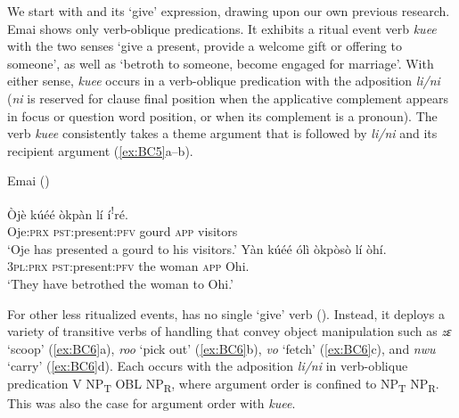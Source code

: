 \documentclass[output=paper,colorlinks,citecolor=brown]{langscibook}
\begin{document}
We start with  and its ‘give’ expression, drawing upon our own previous research. Emai shows only verb-oblique predications. It exhibits a ritual event verb \textit{kuee} with the two senses ‘give a present, provide a welcome gift or offering to someone’, as well as ‘betroth to someone, become engaged for marriage’. With either sense, \textit{kuee} occurs in a verb-oblique predication with the  adposition \textit{li/ni} (\textit{ni} is reserved for clause final position when the applicative complement appears in focus or question word position, or when its complement is a pronoun). The verb \textit{kuee} consistently takes a theme argument that is followed by \textit{li/ni} and its recipient argument (\ref{ex:BC5}a--b).

\ea \label{ex:BC5} Emai (\citealt[241]{SchaeferEgbokhare2007})
\begin{xlist}
\ex
\gll Òjè		kúéé	òkpàn		lí			í\textsuperscript{ǃ}ré.\\
	Oje:\textsc{prx} \textsc{pst}:present:\textsc{pfv}		gourd			\textsc{app}	visitors\\
\glt						‘Oje has presented a gourd to his visitors.’
\ex 
\gll Yàn				kúéé	ólì		òkpòsò		lí			òhí.\\
	\textsc{3pl:prx} \textsc{pst}:present:\textsc{pfv}	the	woman		\textsc{app}	Ohi.\\
\glt			‘They have betrothed the woman to Ohi.’
\end{xlist}
\z

For other less ritualized events,  has no single ‘give’ verb (\cite{SchaeferEgbokhare2007, SchaeferEgbokhare2010, SchaeferEgbokhare2017}). Instead, it deploys a variety of transitive verbs of handling that convey object manipulation such as \textit{zɛ} ‘scoop’ (\ref{ex:BC6}a), \textit{roo} ‘pick out’ (\ref{ex:BC6}b), \textit{vo} ‘fetch’ (\ref{ex:BC6}c), and \textit{nwu} ‘carry’ (\ref{ex:BC6}d). Each occurs with the 
 adposition \textit{li/ni} in verb-oblique predication V NP\textsubscript{T} OBL NP\textsubscript{R}, where argument order is confined to NP\textsubscript{T} NP\textsubscript{R}. This was also the case for argument order with \textit{kuee}.
\end{document}
